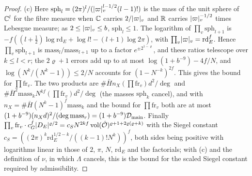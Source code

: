 \begin{proof}
(c) Here $\mathrm{sph}_l=(2\pi)^l/(\lvert \varpi\rvert_v^{l-1/2}(l-1)!)$ is the mass of the unit sphere of $\mathbb{C}^l$ for the fibre measure when $\mathbb{C}$ carries $2/\lvert \varpi\rvert_v$ and $\mathbb{R}$ carries $\lvert \varpi\rvert_v^{-1/2}$ times Lebesgue measure; as $2\le\lvert \varpi\rvert_v\le b$, $\mathrm{sph}_l\le1$.
The logarithm of $\prod_v\mathrm{sph}_{l+1}$ is $-f((l+\frac12)\log\mathrm{rd}_E+\log l!-(l+1)\log2\pi)$, with $\prod_v\lvert \varpi\rvert_v=\mathrm{rd}_E^f$. Hence $\prod_v\mathrm{sph}_{l+1}$ is $\mathrm{mass}_l/\mathrm{mass}_{l+1}$ up to a factor $e^{\pm2^{1-\varrho}}$, and these ratios telescope over $k\le l<r$; the $2\varrho+1$ errors add up to at
most $\log(1+b^{-9})-4f/N$, and $\log(N^k/(N^k-1))\le2/N$ accounts for $(1-N^{-k})^{2f}$. This gives the bound for $\prod\mathrm{fr}_v$. The two products are $\#\bar H n_X(\prod\mathrm{fr}_v)d^2/\deg$ and $\#\bar H^2\mathrm{mass}_kN^{kf}(\prod\mathrm{fr}_v)d^2/\deg$ (the masses $\mathrm{sph}_k$ cancel), and with
$n_X=\#\bar H(N^k-1)^f\mathrm{mass}_k$ and the bound for $\prod\mathrm{fr}_v$ both are at most $(1+b^{-9})(n_Xd)^2/(\deg\mathrm{mass}_r)=(1+b^{-9})\mathcal D_{\rm main}$. Finally $\prod_v\mathrm{fr}_v\cdot c_G^f\lvert D_E\rvert^{\varrho/2}=c_SN^{2kf}\operatorname{vol}(\hat{\mathcal{O}})^{\varrho+1+2\varrho(\varrho+k)}$ with the Siegel constant
$c_S=((2\pi)^k\mathrm{rd}_E^{1/2-k}/((k-1)!N^k))^f$, both sides being positive with logarithms linear in those of $2$, $\pi$, $N$, $\mathrm{rd}_E$ and the factorials; with (c) and the definition of $\nu$, in which $\Lambda$ cancels, this is the bound for the scaled Siegel constant
required by admissibility.
\end{proof}

